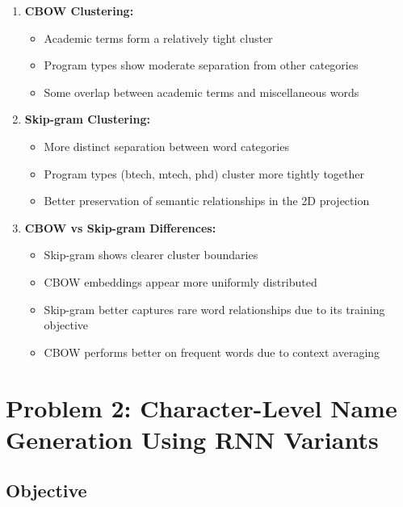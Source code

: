 \documentclass[12pt,a4paper]{article}
\begin{document}
\begin{enumerate}
    \item \textbf{CBOW Clustering:}
    \begin{itemize}
        \item Academic terms form a relatively tight cluster
        \item Program types show moderate separation from other categories
        \item Some overlap between academic terms and miscellaneous words
    \end{itemize}

    \item \textbf{Skip-gram Clustering:}
    \begin{itemize}
        \item More distinct separation between word categories
        \item Program types (btech, mtech, phd) cluster more tightly together
        \item Better preservation of semantic relationships in the 2D projection
    \end{itemize}

    \item \textbf{CBOW vs Skip-gram Differences:}
    \begin{itemize}
        \item Skip-gram shows clearer cluster boundaries
        \item CBOW embeddings appear more uniformly distributed
        \item Skip-gram better captures rare word relationships due to its training objective
        \item CBOW performs better on frequent words due to context averaging
    \end{itemize}
\end{enumerate}

\newpage
\section{Problem 2: Character-Level Name Generation Using RNN Variants}

\subsection{Objective}
\end{document}
